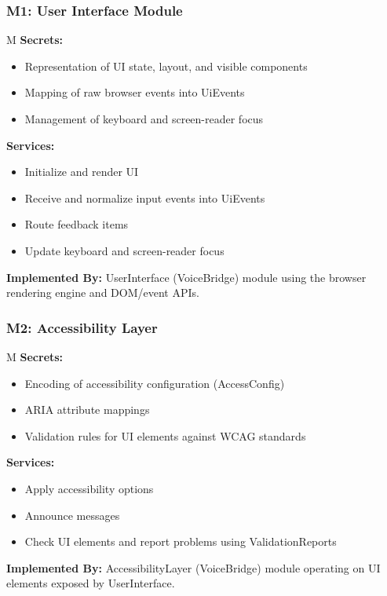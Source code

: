 \documentclass[12pt, titlepage]{article}
\newcounter{mnum}
\newcommand{\mthemnum}{M\themnum}
\begin{document}
\subsubsection*{M1: User Interface Module} \mthemnum\label{m1}
\textbf{Secrets:} 
\begin{itemize}
  \item Representation of UI state, layout, and visible components
  \item Mapping of raw browser events into UiEvents
  \item Management of keyboard and screen-reader focus
\end{itemize}
\textbf{Services:} 
\begin{itemize}
  \item Initialize and render UI
  \item Receive and normalize input events into UiEvents
  \item Route feedback items
  \item Update keyboard and screen-reader focus
\end{itemize}
\textbf{Implemented By:} UserInterface (VoiceBridge) module using the browser rendering engine and DOM/event APIs.

\medskip
\subsubsection*{M2: Accessibility Layer} \mthemnum\label{m2}
\textbf{Secrets:} 
\begin{itemize}
  \item Encoding of accessibility configuration (AccessConfig)
  \item ARIA attribute mappings
  \item Validation rules for UI elements against WCAG standards
\end{itemize}
\textbf{Services:} 
\begin{itemize}
  \item Apply accessibility options
  \item Announce messages
  \item Check UI elements and report problems using ValidationReports
\end{itemize}
\textbf{Implemented By:} AccessibilityLayer (VoiceBridge) module operating on UI elements exposed by UserInterface.

\medskip
\end{document}
